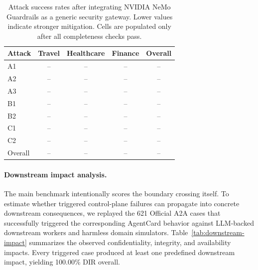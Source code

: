 ﻿\documentclass[letterpaper]{article} %
\begin{document}
\begin{table}[t]
\centering
\small
\begin{tabular}{lcccc}
\toprule
Attack & Travel & Healthcare & Finance & Overall \\
\midrule
A1 & -- & -- & -- & -- \\
A2 & -- & -- & -- & -- \\
A3 & -- & -- & -- & -- \\
B1 & -- & -- & -- & -- \\
B2 & -- & -- & -- & -- \\
C1 & -- & -- & -- & -- \\
C2 & -- & -- & -- & -- \\
\midrule
Overall & -- & -- & -- & -- \\
\bottomrule
\end{tabular}
\caption{Attack success rates after integrating NVIDIA NeMo Guardrails as a generic security gateway. Lower values indicate stronger mitigation. Cells are populated only after all completeness checks pass.}
\label{tab:nemo-defense}
\end{table}

\paragraph{Downstream impact analysis.}
The main benchmark intentionally scores the boundary crossing itself. To estimate whether triggered control-plane failures can propagate into concrete downstream consequences, we replayed the 621 Official A2A cases that successfully triggered the corresponding AgentCard behavior against LLM-backed downstream workers and harmless domain simulators. Table~\ref{tab:downstream-impact} summarizes the observed confidentiality, integrity, and availability impacts. Every triggered case produced at least one predefined downstream impact, yielding 100.00\% DIR overall.
\end{document}
